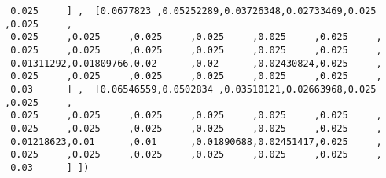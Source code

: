 \begin{verbatim}
 0.025     ] ,  [0.0677823 ,0.05252289,0.03726348,0.02733469,0.025     ,0.025     ,
 0.025     ,0.025     ,0.025     ,0.025     ,0.025     ,0.025     ,
 0.025     ,0.025     ,0.025     ,0.025     ,0.025     ,0.025     ,
 0.01311292,0.01809766,0.02      ,0.02      ,0.02430824,0.025     ,
 0.025     ,0.025     ,0.025     ,0.025     ,0.025     ,0.025     ,
 0.03      ] ,  [0.06546559,0.0502834 ,0.03510121,0.02663968,0.025     ,0.025     ,
 0.025     ,0.025     ,0.025     ,0.025     ,0.025     ,0.025     ,
 0.025     ,0.025     ,0.025     ,0.025     ,0.025     ,0.025     ,
 0.01218623,0.01      ,0.01      ,0.01890688,0.02451417,0.025     ,
 0.025     ,0.025     ,0.025     ,0.025     ,0.025     ,0.025     ,
 0.03      ] ])
 
 \end{verbatim}